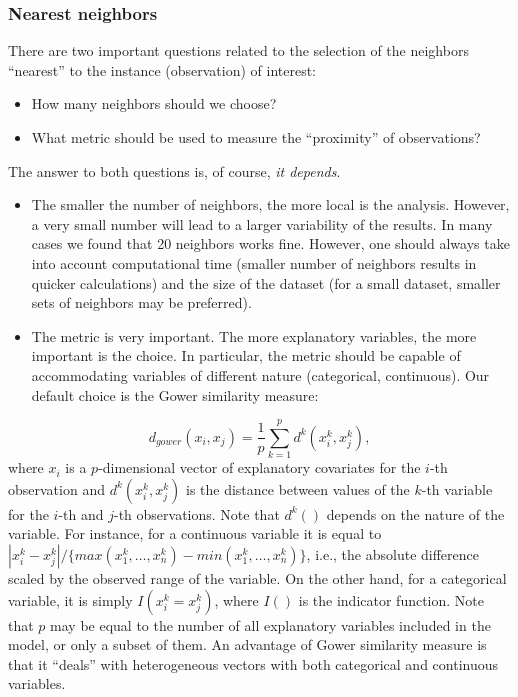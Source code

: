 \documentclass[12pt,]{krantz}
\providecommand{\tightlist}{%
  \setlength{\itemsep}{0pt}\setlength{\parskip}{0pt}}
\begin{document}
\hypertarget{cPLocDiagNeighbors}{%
\subsubsection{Nearest neighbors}\label{cPLocDiagNeighbors}}

There are two important questions related to the selection of the neighbors ``nearest'' to the instance (observation) of interest:

\begin{itemize}
\tightlist
\item
  How many neighbors should we choose?
\item
  What metric should be used to measure the ``proximity'' of observations?
\end{itemize}

The answer to both questions is, of course, \emph{it depends}.

\begin{itemize}
\tightlist
\item
  The smaller the number of neighbors, the more local is the analysis. However, a very small number will lead to a larger variability of the results. In many cases we found that 20 neighbors works fine. However, one should always take into account computational time (smaller number of neighbors results in quicker calculations) and the size of the dataset (for a small dataset, smaller sets of neighbors may be preferred).
\item
  The metric is very important. The more explanatory variables, the more important is the choice. In particular, the metric should be capable of accommodating variables of different nature (categorical, continuous). Our default choice is the Gower similarity measure:
\end{itemize}

\[
d_{gower}(x_i, x_j) = \frac 1p \sum_{k=1}^p d^k(x_i^k, x_j^k),
\]
where \(x_i\) is a \(p\)-dimensional vector of explanatory covariates for the \(i\)-th observation and \(d^k(x_i^k,x_j^k)\) is the distance between values of the \(k\)-th variable for the \(i\)-th and \(j\)-th observations. Note that \(d^k()\) depends on the nature of the variable. For instance, for a continuous variable it is equal to \(|x_i^k-x_j^k|/\{max(x_1^k,\ldots,x_n^k)-min(x_1^k,\ldots,x_n^k)\}\), i.e., the absolute difference scaled by the observed range of the variable. On the other hand, for a categorical variable, it is simply \(I(x_i^k = x_j^k)\), where \(I()\) is the indicator function. Note that \(p\) may be equal to the number of all explanatory variables included in the model, or only a subset of them. An advantage of Gower similarity measure is that it ``deals'' with heterogeneous vectors with both categorical and continuous variables.
\end{document}
